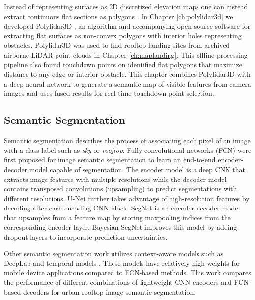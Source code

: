Instead of representing surfaces as 2D discretized elevation maps one can instead extract continuous flat sections as polygons \cite{lee_indoor_2012-1}. In Chapter \ref{ch:polylidar3d} we developed Polylidar3D \cite{castagno_polylidar3d_2020}, an algorithm and accompanying open-source software for extracting flat surfaces as non-convex polygons with interior holes representing obstacles.  Polylidar3D was used to find rooftop landing sites from archived airborne LiDAR point clouds in Chapter \ref{ch:maplanding}. This offline processing pipeline also found touchdown points on identified flat polygons that maximize distance to any edge or interior obstacle. This chapter combines Polylidar3D with a deep neural network to generate a semantic map of visible features from camera images and uses fused results for real-time touchdown point selection.

\subsection{Semantic Segmentation}\label{sec:ch6_related_pixel}
Semantic segmentation describes the process of associating each pixel of an image with a class label such as \emph{sky} or \emph{rooftop}.  Fully convolutional networks (FCN) were first proposed for image semantic segmentation \cite{shelhamer_fully_2017} to learn an end-to-end encoder-decoder model capable of segmentation. The encoder model is a deep CNN that extracts image features with multiple resolutions while the decoder model contains transposed convolutions (upsampling) to predict segmentations with different resolutions. U-Net \cite{ronneberger_u-net_2015} further takes advantage of high-resolution features by decoding after each encoding CNN block. SegNet \cite{badrinarayanan_segnet_2017} is an encoder-decoder model that upsamples from a feature map by storing maxpooling indices from the corresponding encoder layer. Bayesian SegNet \cite{kendall_bayesian_2017} improves this model by adding dropout layers to incorporate prediction uncertainties.

Other semantic segmentation work utilizes context-aware models such as DeepLab \cite{chen_rethinking_2017, chen_deeplab_2018} and temporal models \cite{siam_comparative_2018}. These models have relatively high weights for mobile device applications compared to FCN-based methods. This work compares the performance of different combinations of lightweight CNN encoders and FCN-based decoders for urban rooftop image semantic segmentation. 


